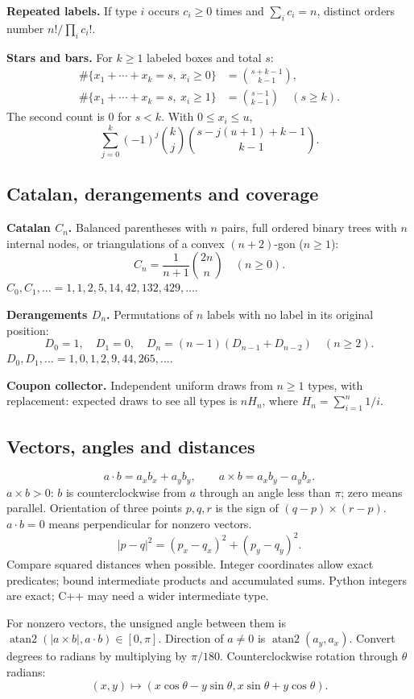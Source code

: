 \textbf{Repeated labels.} If type $i$ occurs $c_i\ge0$ times and
$\sum_i c_i=n$, distinct orders number $n!/\prod_i c_i!$.

\textbf{Stars and bars.} For $k\ge1$ labeled boxes and total $s$:
\[
\begin{aligned}
 \#\{x_1+\cdots+x_k=s,\ x_i\ge0\}
   &=\binom{s+k-1}{k-1},\\
 \#\{x_1+\cdots+x_k=s,\ x_i\ge1\}
   &=\binom{s-1}{k-1}\quad(s\ge k).
\end{aligned}
\]
The second count is 0 for $s<k$. With $0\le x_i\le u$,
\[
 \sum_{j=0}^{k}(-1)^j\binom kj
      \binom{s-j(u+1)+k-1}{k-1}.
\]

\subsection{Catalan, derangements and coverage}
\textbf{Catalan $C_n$.} Balanced parentheses with $n$ pairs,
full ordered binary trees with $n$ internal nodes, or triangulations
of a convex $(n+2)$-gon ($n\ge1$):
\[
 C_n=\frac{1}{n+1}\binom{2n}{n}\quad(n\ge0).
\]
$C_0,C_1,\ldots=1,1,2,5,14,42,132,429,\ldots$.

\textbf{Derangements $D_n$.} Permutations of $n$ labels with no label
in its original position:
\[
 D_0=1,\quad D_1=0,\quad
 D_n=(n-1)(D_{n-1}+D_{n-2})\quad(n\ge2).
\]
$D_0,D_1,\ldots=1,0,1,2,9,44,265,\ldots$.

\textbf{Coupon collector.} Independent uniform draws from $n\ge1$
types, with replacement: expected draws to see all types is
$nH_n$, where $H_n=\sum_{i=1}^n1/i$.

\subsection{Vectors, angles and distances}\label{math:geometry}
\[
 a\cdot b=a_xb_x+a_yb_y,\qquad
 a\times b=a_xb_y-a_yb_x.
\]
$a\times b>0$: $b$ is counterclockwise from $a$ through an angle
less than $\pi$; zero means parallel. Orientation of three points
$p,q,r$ is the sign of $(q-p)\times(r-p)$.
$a\cdot b=0$ means perpendicular for nonzero vectors.
\[
 |p-q|^2=(p_x-q_x)^2+(p_y-q_y)^2.
\]
Compare squared distances when possible. Integer coordinates allow
exact predicates; bound intermediate products and accumulated sums.
Python integers are exact; C++ may need a wider intermediate type.

For nonzero vectors, the unsigned angle between them is
$\operatorname{atan2}(|a\times b|,a\cdot b)\in[0,\pi]$.
Direction of $a\ne0$ is $\operatorname{atan2}(a_y,a_x)$.
Convert degrees to radians by multiplying by $\pi/180$.
Counterclockwise rotation through $\theta$ radians:
\[
 (x,y)\mapsto(x\cos\theta-y\sin\theta,
              x\sin\theta+y\cos\theta).
\]

